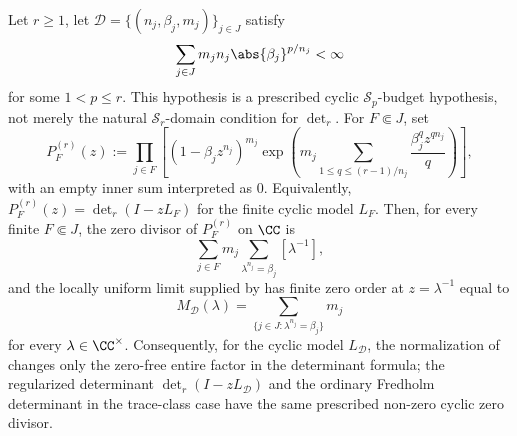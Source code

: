 \begin{proposition}
  \label{prop:regularized-zero-divisor-chain}
  Let \(r\ge1\), let \(\mathcal D=\{(n_j,\beta_j,m_j)\}_{j\in J}\) satisfy
  \[
    \sum_{j\in J}m_jn_j\abs{\beta_j}^{p/n_j}<\infty
  \]
  for some \(1<p\le r\).  This hypothesis is a prescribed cyclic
  \(\mathcal S_p\)-budget hypothesis, not merely the natural
  \(\mathcal S_r\)-domain condition for \(\det_r\).  For \(F\Subset J\), set
  \[
    P_F^{(r)}(z):=
    \prod_{j\in F}
    \left[(1-\beta_jz^{n_j})^{m_j}
      \exp\!\left(
        m_j\sum_{1\le q\le (r-1)/n_j}
          \frac{\beta_j^qz^{qn_j}}{q}
      \right)\right],
  \]
  with an empty inner sum interpreted as \(0\).  Equivalently,
  \(P_F^{(r)}(z)=\det_r(I-zL_F)\) for the finite cyclic model \(L_F\).
  Then, for
  every finite \(F\Subset J\), the zero divisor of \(P_F^{(r)}
  \) on \(\CC\) is
  \[
    \sum_{j\in F}m_j\sum_{\lambda^{n_j}=\beta_j}[\lambda^{-1}],
  \]
  and the locally uniform limit supplied by
   has finite zero order at
  \(z=\lambda^{-1}\) equal to
  \[
    M_{\mathcal D}(\lambda)
    =\sum_{\{j\in J:\lambda^{n_j}=\beta_j\}}m_j
  \]
  for every \(\lambda\in\CC^\times\). Consequently, for the cyclic model
  \(L_{\mathcal D}\), the normalization of
   changes only the
  zero-free entire factor in the determinant formula; the regularized
  determinant \(\det_r(I-zL_{\mathcal D})\) and the ordinary Fredholm
  determinant in the trace-class case have the same prescribed non-zero
  cyclic zero divisor.
\end{proposition}


